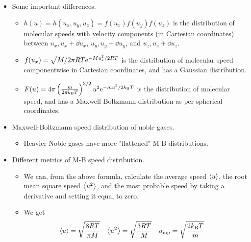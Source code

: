 \documentclass[../notes.tex]{subfiles}
\begin{document}
\begin{itemize}
\begin{itemize}
    \end{itemize}
    \item Some important differences.
    \begin{itemize}
        \item $h(u)=h(u_x,u_y,u_z)=f(u_x)f(u_y)f(u_z)$ is the distribution of molecular speeds with velocity components (in Cartesian coordinates) between $u_x,u_x+\dd{u_x}$, $u_y,u_y+\dd{u_y}$, and $u_z,u_z+\dd{u_z}$.
        \item $f(u_x)=\sqrt{M/2\pi RT}\e[-Mu_x^2/2RT]$ is the distribution of molecular speed componentwise in Cartesian coordinates, and has a Gaussian distribution.
        \item $F(u)=4\pi\left( \frac{m}{2\pi\kB T} \right)^{3/2}u^2\e[-mu^2/2\kB T]$ is the distribution of molecular speed, and has a Maxwell-Boltzmann distribution as per spherical coordinates.
    \end{itemize}
    \item Maxwell-Boltzmann speed distribution of noble gases.
    \begin{itemize}
        \item Heavier Noble gases have more "flattened" M-B distributions.
    \end{itemize}
    \item Different metrics of M-B speed distribution.
    \begin{itemize}
        \item We can, from the above formula, calculate the average speed $\prb{u}$, the root mean square speed $\prb{u^2}$, and the most probable speed by taking a derivative and setting it equal to zero.
        \item We get
        \begin{align*}
            \prb{u} &= \sqrt{\frac{8RT}{\pi M}}&
            \prb{u^2} &= \sqrt{\frac{3RT}{M}}&
            u_\text{mp} &= \sqrt{\frac{2\kB T}{m}}
        \end{align*}
    \end{itemize}
\end{itemize}
\end{document}
